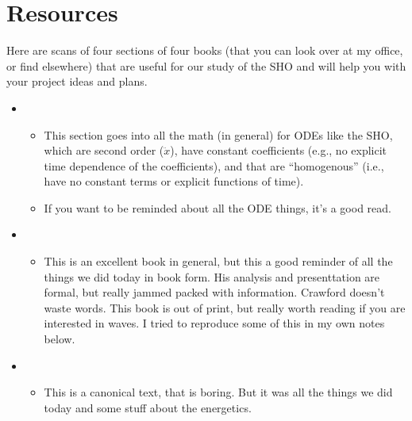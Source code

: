 \documentclass[letterpaper,10pt,english]{jupyterBook}
\begin{document}
\section{Resources}
\label{\detokenize{content/1_mechanics/sho/notes-SHO:resources}}
\sphinxAtStartPar
Here are scans of four sections of four books (that you can look over at my office, or find elsewhere) that are useful for our study of the SHO and will help you with your project ideas and plans.

\sphinxAtStartPar
{}
\begin{itemize}
\item {} 
\sphinxAtStartPar
{}
\begin{itemize}
\item {} 
\sphinxAtStartPar
This section goes into all the math (in general) for ODEs like the SHO, which are second order (\(\ddot{x}\)), have constant coefficients (e.g., no explicit time dependence of the coefficients), and that are “homogenous” (i.e., have no constant terms or explicit functions of time).

\item {} 
\sphinxAtStartPar
If you want to be reminded about all the ODE things, it’s a good read.

\end{itemize}

\item {} 
\sphinxAtStartPar
{}
\begin{itemize}
\item {} 
\sphinxAtStartPar
This is an excellent book in general, but this a good reminder of all the things we did today in book form. His analysis and presenttation are formal, but really jammed packed with information. Crawford doesn’t waste words. This book is out of print, but really worth reading if you are interested in waves. I tried to reproduce some of this in my own notes below.

\end{itemize}

\item {} 
\sphinxAtStartPar
{}
\begin{itemize}
\item {} 
\sphinxAtStartPar
This is a canonical text, that is boring. But it was all the things we did today and some stuff about the energetics.


\end{itemize}
\end{itemize}
\end{document}
